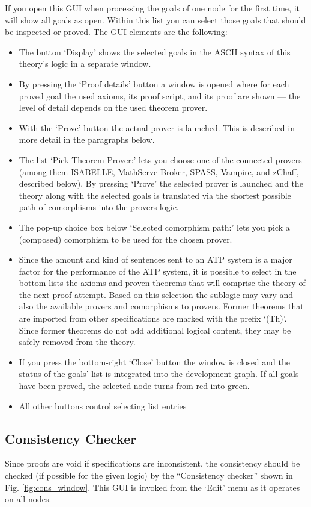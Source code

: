 \documentclass{article}
\newcommand{\normalTEXTSC}[2]{{#1\scriptsize#2}}
\newcommand     {\Isabelle}{\normalTEXTSC{I}{SABELLE}\xspace}
\newcommand     {\SPASS}{\normalTEXTSC{S}{PASS}\xspace}
\begin{document}
If you open this GUI when processing the goals of one node for the
first time, it will show all goals as open. Within this list you can
select those goals that should be inspected or proved. The GUI elements are the following:

\begin{itemize}
\item The button `Display' shows the selected goals in the ASCII syntax of
  this theory's logic in a separate window.
\item By pressing the `Proof details' button a window is opened where for each
  proved goal the used axioms, its proof script, and its proof are shown ---
  the level of detail depends on the used theorem prover.
\item With the `Prove' button the actual prover is launched. This is described
  in more detail in the paragraphs below.
\item The list `Pick Theorem Prover:' lets you choose one of the connected
  provers (among them \Isabelle, MathServe Broker, \SPASS, Vampire, and
  zChaff, described below). By pressing `Prove' the selected prover is
  launched and the theory along with the selected goals is translated via the
  shortest possible path of comorphisms into the provers logic.
\item The pop-up choice box below `Selected comorphism path:' lets you pick a
  (composed) comorphism to be used for the chosen prover.
\item Since the amount and kind of sentences sent to an ATP system is a major
  factor for the performance of the ATP system, it is possible to select in
  the bottom lists the axioms and proven theorems that will comprise the
  theory of the next proof attempt. Based on this selection the sublogic may
  vary and also the available provers and comorphisms to provers. Former
  theorems that are imported from other specifications are marked with the
  prefix `(Th)'. Since former theorems do not add additional logical content,
  they may be safely removed from the theory.
\item If you press the bottom-right `Close' button the window is closed and
  the status of the goals' list is integrated into the development graph. If
  all goals have been proved, the selected node turns from red into green.
\item All other buttons control selecting list entries
\end{itemize}

\subsection{Consistency Checker}
\label{sec:CC}
Since proofs are void if specifications are inconsistent, the consistency
should be checked (if possible for the given logic) by the ``Consistency
checker'' shown in Fig. \ref{fig:cons_window}.  This GUI is invoked from
the `Edit' menu as it operates on all nodes.
\end{document}
